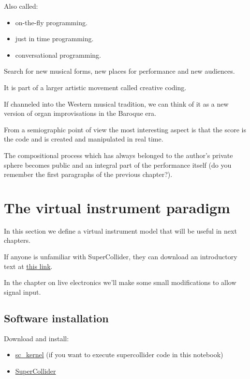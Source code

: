 Also called:

\begin{itemize}
\tightlist
\item on-the-fly programming.
\item just in time programming.
\item conversational programming.
\end{itemize}

Search for new musical forms, new places for performance and new audiences.

It is part of a larger artistic movement called creative coding.

If channeled into the Western musical tradition, we can think of it as a new version of organ improvisations in the Baroque era.

From a semiographic point of view the most interesting aspect is that the score is the code and is created and manipulated in real time.

The compositional process which has always belonged to the author's private sphere becomes public and an integral part of the performance itself (do you remember the first paragraphs of the previous chapter?).

\section{The virtual instrument paradigm}\label{the-virtual-instrument-paradigm}

In this section we define a virtual instrument model that will be useful in next chapters.

If anyone is unfamiliar with SuperCollider, they can download an introductory text at
\href{https://ccrma.stanford.edu/~ruviaro/texts/A_Gentle_Introduction_To_SuperCollider.pdf}{this
link}.

In the chapter on live electronics we'll make some small modifications to allow signal input.

\subsection{Software installation }\label{software-installation}

Download and install:

\begin{itemize}
\tightlist
\item \href{https://github.com/capital-G/sc_kernel}{sc\_kernel} (if you want to execute supercollider code in this notebook)
\item \href{https://supercollider.github.io/}{SuperCollider}
\end{itemize}

